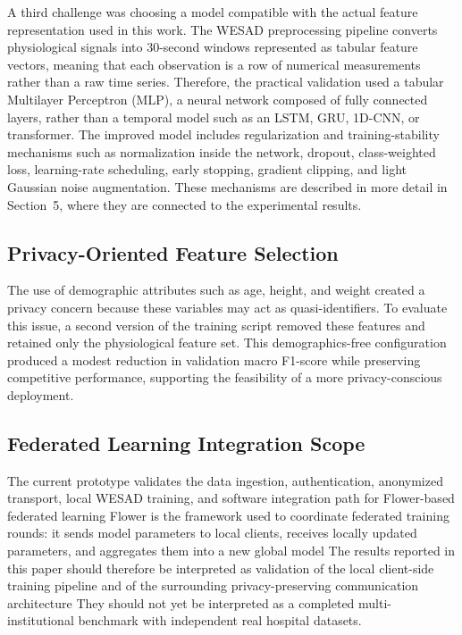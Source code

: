 \documentclass[12pt]{article}
\newcommand{\removido}[1]{{\color{COR_REMOVIDO}#1}}
\begin{document}
A third challenge was choosing a model compatible with the actual feature representation used in this work. The WESAD preprocessing pipeline converts physiological signals into 30-second windows represented as tabular feature vectors, meaning that each observation is a row of numerical measurements rather than a raw time series. Therefore, the practical validation used a tabular Multilayer Perceptron (MLP), a neural network composed of fully connected layers, rather than a temporal model such as an LSTM, GRU, 1D-CNN, or transformer. The improved model includes regularization and training-stability mechanisms such as normalization inside the network, dropout, class-weighted loss, learning-rate scheduling, early stopping, gradient clipping, and light Gaussian noise augmentation. These mechanisms are described in more detail in Section~5, where they are connected to the experimental results.

\subsection{Privacy-Oriented Feature Selection}

The use of demographic attributes such as age, height, and weight created a privacy concern because these variables may act as quasi-identifiers. To evaluate this issue, a second version of the training script removed these features and retained only the physiological feature set. This demographics-free configuration produced a modest reduction in validation macro F1-score while preserving competitive performance, supporting the feasibility of a more privacy-conscious deployment.

\subsection{Federated Learning Integration Scope}

The current prototype validates the data ingestion, authentication, anonymized transport, local WESAD training, and software integration path for Flower-based federated learning \removido{Flower is the framework used to coordinate federated training rounds: it sends model parameters to local clients, receives locally updated parameters, and aggregates them into a new global model} The results reported in this paper should therefore be interpreted as validation of the local client-side training pipeline and of the surrounding privacy-preserving communication architecture They should not yet be interpreted as a completed multi-institutional benchmark with independent real hospital datasets.
\end{document}
